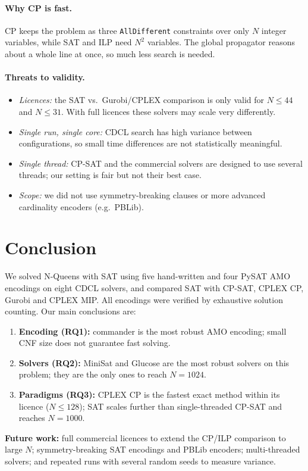 \documentclass[a4paper,fleqn]{cas-sc}
\begin{document}
\paragraph{Why CP is fast.}
CP keeps the problem as three \texttt{AllDifferent} constraints over only $N$ integer variables, while SAT and ILP need $N^2$ variables. The global propagator reasons about a whole line at once, so much less search is needed.

\paragraph{Threats to validity.}
\begin{itemize}
  \item \emph{Licences:} the SAT vs.\ Gurobi/CPLEX comparison is only valid for $N\le44$ and $N\le31$. With full licences these solvers may scale very differently.
  \item \emph{Single run, single core:} CDCL search has high variance between configurations, so small time differences are not statistically meaningful.
  \item \emph{Single thread:} CP-SAT and the commercial solvers are designed to use several threads; our setting is fair but not their best case.
  \item \emph{Scope:} we did not use symmetry-breaking clauses or more advanced cardinality encoders (e.g.\ PBLib).
\end{itemize}

\section{Conclusion}\label{sec:conclusion}
We solved N-Queens with SAT using five hand-written and four PySAT AMO encodings on eight CDCL solvers, and compared SAT with CP-SAT, CPLEX CP, Gurobi and CPLEX MIP. All encodings were verified by exhaustive solution counting. Our main conclusions are:
\begin{enumerate}
  \item \textbf{Encoding (RQ1):} commander is the most robust AMO encoding; small CNF size does not guarantee fast solving.
  \item \textbf{Solvers (RQ2):} MiniSat and Glucose are the most robust solvers on this problem; they are the only ones to reach $N=1024$.
  \item \textbf{Paradigms (RQ3):} CPLEX CP is the fastest exact method within its licence ($N\le128$); SAT scales further than single-threaded CP-SAT and reaches $N=1000$.
\end{enumerate}
\textbf{Future work:} full commercial licences to extend the CP/ILP comparison to large $N$; symmetry-breaking SAT encodings and PBLib encoders; multi-threaded solvers; and repeated runs with several random seeds to measure variance.
\end{document}
